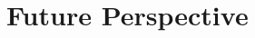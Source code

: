 \documentclass[11pt,a4paper]{article}
\begin{document}
\section{Future Perspective}









\end{document}
